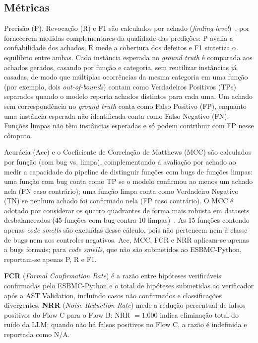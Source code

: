 \documentclass[sigconf]{acmart}
\begin{document}



\subsection{Métricas}
\label{sec:metricas}

Precisão (P), Revocação (R) e F1 são calculados por achado
(\textit{finding-level})~\cite{ding2025primevul}, por fornecerem medidas
complementares da qualidade das predições: P avalia a confiabilidade dos
achados, R mede a cobertura dos defeitos e F1 sintetiza o equilíbrio entre
ambas. Cada instância esperada no \textit{ground truth} é comparada aos
achados gerados, casando por função e categoria, sem reutilizar
instâncias já casadas, de modo que múltiplas ocorrências da mesma
categoria em uma função (por exemplo, dois \textit{out-of-bounds})
contam como Verdadeiros Positivos (TPs) separados quando o modelo reporta
achados distintos para cada uma. Um achado sem correspondência no
\textit{ground truth} conta como Falso Positivo (FP), enquanto uma
instância esperada não identificada conta como Falso Negativo (FN).
Funções limpas não têm instâncias esperadas e só podem contribuir com FP
nesse cômputo.

Acurácia (Acc) e o Coeficiente de Correlação de Matthews (MCC) são
calculados por função (com bug vs. limpa), complementando a avaliação por
achado ao medir a capacidade do pipeline de distinguir funções com bugs
de funções limpas: uma função com bug conta como TP se o modelo confirmou
ao menos um achado nela (FN caso contrário); uma função limpa conta como
Verdadeiro Negativo (TN) se nenhum achado foi confirmado nela (FP caso
contrário). O MCC é adotado por considerar os quatro quadrantes de forma
mais robusta em datasets desbalanceados (45 funções com bug contra 10
limpas)~\cite{ding2025primevul}. As 15 funções contendo apenas
\textit{code smells} são excluídas desse cálculo, pois não pertencem nem
à classe de bugs nem aos controles negativos. Acc, MCC, FCR e NRR
aplicam-se apenas a bugs formais; para \textit{code smells}, que não são
submetidos ao ESBMC-Python, reportam-se apenas P, R e F1.

\textbf{FCR} (\textit{Formal Confirmation Rate}) é a razão entre
hipóteses verificáveis confirmadas pelo ESBMC-Python e o total de
hipóteses submetidas ao verificador após a AST Validation, incluindo
casos não confirmados e classificações divergentes. \textbf{NRR}
(\textit{Noise Reduction Rate}) mede a redução percentual de falsos
positivos do Flow C para o Flow B: NRR $=1.000$ indica eliminação total
do ruído da LLM; quando não há falsos positivos no Flow C, a razão é
indefinida e reportada como N/A.
\end{document}
